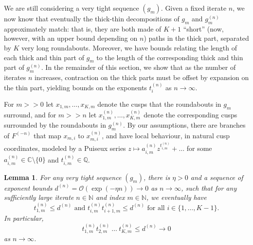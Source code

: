 \documentclass{amsart}
\newcommand\C{{\mathbb{C}}}
\newcommand\Q{{\mathbb{Q}}}
\newcommand\N{{\mathbb{N}}}
\newtheorem{lem}[thm]{Lemma}
\theoremstyle{definition}
\theoremstyle{remark}
\renewcommand\gg{>\!\!>}
\begin{document}
We are still considering a very tight sequence $(g_m)$.  Given a fixed iterate $n$, we now know that eventually the thick-thin decompositions of $g_m$ and $g_m^{(n)}$ approximately match: that is, they are both made of $K+1$ ``short'' (now, however, with an upper bound depending on $n$) paths in the thick part, separated by $K$ very long roundabouts. Moreover, we have bounds relating the length of each thick and thin part of $g_m$ to the length of the corresponding thick and thin part of $g_m^{(n)}$. In the remainder of this section, we show that as the number of iterates $n$ increases, contraction on the thick parts must be offset by expansion on the thin part, yielding bounds on the exponents $t_i^{(n)}$ as $n\to\infty$. 

For $m\gg0$ let $x_{1,m},\dots,x_{K,m}$ denote the cusps that the roundabouts in $g_m$ surround, and for $m\gg n$ let $x_{1,m}^{(n)},\dots,x_{K,m}^{(n)}$ denote the corresponding cusps surrounded by the roundabouts in $g_m^{(n)}$. By our assumptions, there are branches of $F^{(-n)}$ that map $x_{m,i}$ to $x_{m,i}^{(n)}$, and have local behaviour, in natural cusp coordinates, modeled by a Puiseux series $z\mapsto a^{(n)}_{i,m}z^{t^{(n)}_{i,m}}+\ldots$ for some $a^{(n)}_{i,m}\in\C\setminus \{0\}$ and $t^{(n)}_{i,m}\in\Q$.

\begin{lem}\label{lem:tdown}
  For any very tight sequence $(g_m)$, there is $\eta > 0$ and a sequence of exponent bounds $d^{(n)}=\mathcal O(\exp(-\eta n))\to 0$ as $n\to\infty$, such that for any sufficiently large iterate $n\in\N$ and index $m\in \N$, we eventually  have
\begin{equation}
\label{eqn:exps} 
t^{(n)}_{1,m}\le d^{(n)}\text{ and }t^{(n)}_{i,m}t^{(n)}_{i+1,m}\le d^{(n)}\text{ for all }i\in\{1,\dots,K-1\}.
\end{equation}
In particular, 
\begin{equation}\label{eq:lem:tdown}
t^{(n)}_{1,m}t^{(n)}_{2,m}\ \dots\  t^{(n)}_{K,m} \le d^{(n)}\to 0
\end{equation}
as $n\to\infty$.
\end{lem}
\end{document}
